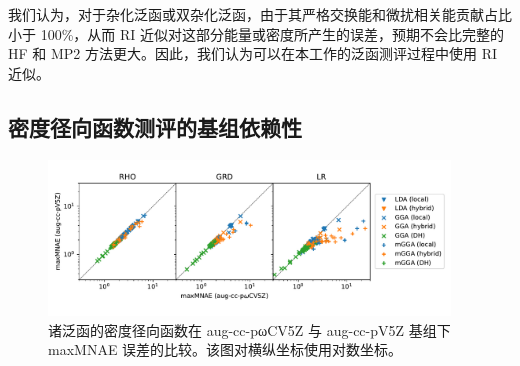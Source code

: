 我们认为，对于杂化泛函或双杂化泛函，由于其严格交换能和微扰相关能贡献占比小于 100\%，从而 RI 近似对这部分能量或密度所产生的误差，预期不会比完整的 HF 和 MP2 方法更大。因此，我们认为可以在本工作的泛函测评过程中使用 RI 近似。

\subsection{密度径向函数测评的基组依赖性}

\begin{figure}[t]
    \centering
    \includegraphics[width=0.95\textwidth]{assets/basisdep-RDF.pdf}
    \caption[aug-cc-pωCV5Z 与 aug-cc-pV5Z 基组下 maxMNAE 误差的比较]{诸泛函的密度径向函数在 aug-cc-pωCV5Z 与 aug-cc-pV5Z 基组下 maxMNAE 误差的比较。该图对横纵坐标使用对数坐标。}
    \label{fig.4.basisdep-RDF}
\end{figure}

